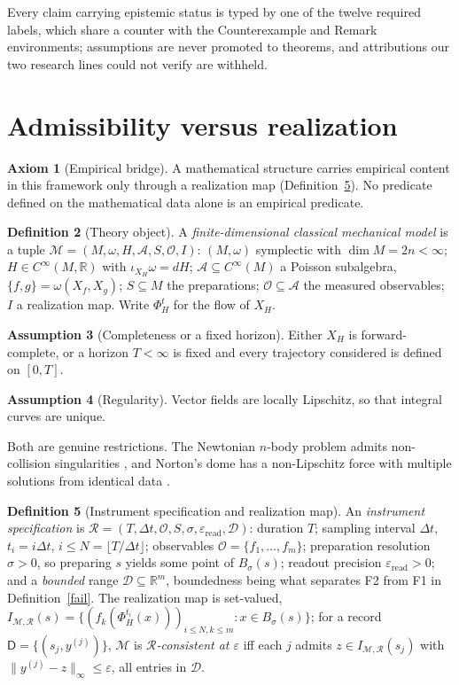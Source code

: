 \documentclass[12pt,a4paper]{article}
\theoremstyle{definition}
\newtheorem{definition}{Definition}[section]
\newtheorem{axiom}[definition]{Axiom}
\newtheorem{assumption}[definition]{Assumption}
\theoremstyle{plain}
\theoremstyle{commentary}
\newcommand{\R}{\mathbb{R}}
\newcommand{\Cinf}{C^{\infty}}
\newcommand{\Oc}{\mathcal{O}}
\newcommand{\Mc}{\mathcal{M}}
\newcommand{\Dsf}{\mathsf{D}}
\newcommand{\eps}{\varepsilon}
\newcommand{\Rc}{\mathcal{R}}
\newcommand{\Ac}{\mathcal{A}}
\begin{document}
Every claim carrying epistemic status is typed by one of the twelve required labels, which share a counter with the Counterexample and Remark environments; assumptions are never promoted to theorems, and attributions our two research lines could not verify are withheld.

\section{Admissibility versus realization}
\label{s2}

\begin{axiom}[Empirical bridge]
\label{axb}
A mathematical structure carries empirical content in this framework only through a realization map (Definition~\ref{rea}). No predicate defined on the mathematical data alone is an empirical predicate.
\end{axiom}

\begin{definition}[Theory object]
\label{mod}
A \emph{finite-dimensional classical mechanical model} is a tuple $\Mc=(M,\omega,H,\Ac,S,\Oc,I)$: $(M,\omega)$ symplectic with $\dim M=2n<\infty$; $H\in\Cinf(M,\R)$ with $\iota_{X_H}\omega=dH$; $\Ac\subseteq\Cinf(M)$ a Poisson subalgebra, $\{f,g\}=\omega(X_f,X_g)$; $S\subseteq M$ the preparations; $\Oc\subseteq\Ac$ the measured observables; $I$ a realization map. Write $\Phi^t_H$ for the flow of $X_H$.
\end{definition}

\begin{assumption}[Completeness or a fixed horizon]
\label{cpl}
Either $X_H$ is forward-complete, or a horizon $T<\infty$ is fixed and every trajectory considered is defined on $[0,T]$.
\end{assumption}

\begin{assumption}[Regularity]
\label{reg}
Vector fields are locally Lipschitz, so that integral curves are unique.
\end{assumption}

Both are genuine restrictions. The Newtonian $n$-body problem admits non-collision singularities \cite{Xia1992}, and Norton's dome has a non-Lipschitz force with multiple solutions from identical data \cite{Norton2008}.

\begin{definition}[Instrument specification and realization map]
\label{rea}
An \emph{instrument specification} is $\Rc=(T,\Delta t,\Oc,S,\sigma,\eps_{\mathrm{read}},\mathcal{D})$: duration $T$; sampling interval $\Delta t$, $t_i=i\Delta t$, $i\le N=\lfloor T/\Delta t\rfloor$; observables $\Oc=\{f_1,\dots,f_m\}$; preparation resolution $\sigma>0$, so preparing $s$ yields some point of $B_\sigma(s)$; readout precision $\eps_{\mathrm{read}}>0$; and a \emph{bounded} range $\mathcal{D}\subseteq\R^m$, boundedness being what separates F2 from F1 in Definition~\ref{fail}. The realization map is set-valued, $I_{\Mc,\Rc}(s)=\{(f_k(\Phi^{t_i}_H(x)))_{i\le N,k\le m}:x\in B_\sigma(s)\}$; for a record $\Dsf=\{(s_j,y^{(j)})\}$, $\Mc$ is \emph{$\Rc$-consistent at $\eps$} iff each $j$ admits $z\in I_{\Mc,\Rc}(s_j)$ with $\|y^{(j)}-z\|_\infty\le\eps$, all entries in $\mathcal{D}$.
\end{definition}
\end{document}
